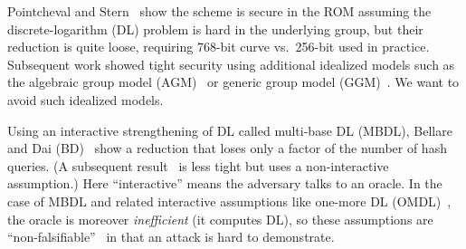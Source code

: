 

  Pointcheval and Stern~\cite{EC:PoiSte96} show the scheme is secure in the ROM assuming the discrete-logarithm (DL) problem is hard in the underlying group, but their reduction is quite loose, requiring 768-bit curve vs.~256-bit used in practice.
 Subsequent work \cite{EC:FucPloSeu20} showed tight security using additional idealized models such as the algebraic group model (AGM)~\cite{C:FucKilLos18} or  generic group model (GGM)~\cite{JMC:NevSmaWar09,EPRINT:Shoup23,C:CLMQ21}.
We want to avoid such idealized models.

Using an interactive strengthening of DL called multi-base DL (MBDL), Bellare and Dai (BD)~\cite{INDOCRYPT:BelDai20} show a reduction that loses only a factor of the number of hash queries.  (A subsequent result~\cite{C:RotSeg21} is  less tight  but uses a non-interactive assumption.) Here ``interactive'' means the adversary talks to an oracle. In the case of MBDL and related interactive assumptions like one-more DL (OMDL)~\cite{JC:BNPS03}, the oracle is moreover \emph{inefficient} (it computes DL), so these assumptions are ``non-falsifiable''~\cite{C:Naor03} in that an attack is hard to demonstrate.%

